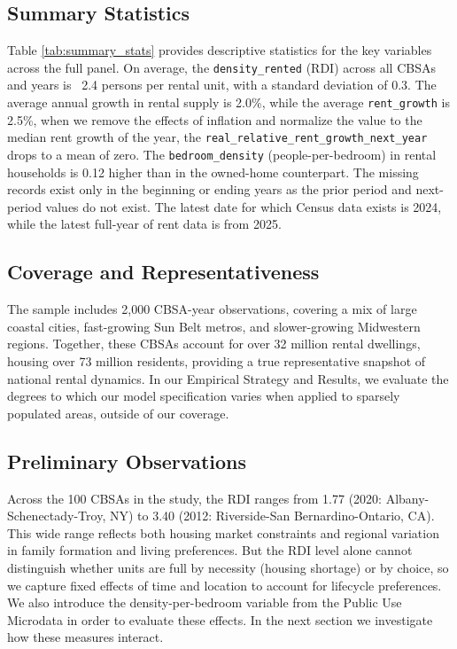 \documentclass[pdflatex,sn-apa]{sn-jnl}%
\theoremstyle{thmstyleone}%
\theoremstyle{thmstyletwo}%
\theoremstyle{thmstylethree}%
\begin{document}


\subsection{Summary Statistics}


Table \ref{tab:summary_stats} provides descriptive statistics for the key variables across the full panel. On average, the \texttt{density\_rented} (RDI) across all CBSAs and years is ~2.4 persons per rental unit, with a standard deviation of 0.3. The average annual growth in rental supply is 2.0\%, while the average \texttt{rent\_growth} is 2.5\%, when we remove the effects of inflation and normalize the value to the median rent growth of the year, the \texttt{real\_relative\_rent\_growth\_next\_year} drops to a mean of zero. The \texttt{bedroom\_density} (people-per-bedroom) in rental households is 0.12 higher than in the owned-home counterpart. The missing records exist only in the beginning or ending years as the prior period and next-period values do not exist. The latest date for which Census data exists is 2024, while the latest full-year of rent data is from 2025. 

\label{summary_stats}

\subsection{Coverage and Representativeness}
The sample includes 2,000 CBSA-year observations, covering a mix of large coastal cities, fast-growing Sun Belt metros, and slower-growing Midwestern regions. Together, these CBSAs account for over 32 million rental dwellings, housing over 73 million residents, providing a true representative snapshot of national rental dynamics. In our Empirical Strategy and Results, we evaluate the degrees to which our model specification varies when applied to sparsely populated areas, outside of our coverage. 

\subsection{Preliminary Observations}

Across the 100 CBSAs in the study, the RDI ranges from 1.77 (2020: Albany-Schenectady-Troy, NY) to 3.40 (2012: Riverside-San Bernardino-Ontario, CA). This wide range reflects both housing market constraints and regional variation in family formation and living preferences. But the RDI level alone cannot distinguish whether units are full by necessity (housing shortage) or by choice, so we capture fixed effects of time and location to account for lifecycle preferences. We also introduce the density-per-bedroom variable from the Public Use Microdata in order to evaluate these effects. In the next section we investigate how these measures interact. 
\end{document}
